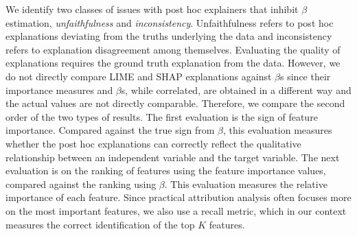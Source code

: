 \documentclass[mnsc,blindrev]{informs3}
\begin{document}
We identify two classes of issues with post hoc explainers that inhibit $\beta$ estimation, \textit{unfaithfulness} and \textit{inconsistency}. Unfaithfulness refers to post hoc explanations deviating from the truths underlying the data and inconsistency refers to explanation disagreement among themselves. Evaluating the quality of explanations requires the ground truth explanation from the data. However, we do not directly compare LIME and SHAP explanations against $\beta$s since their importance measures and $\beta$s, while correlated, are obtained in a different way and the actual values are not directly comparable. Therefore, we compare the second order of the two types of results. The first evaluation is the sign of feature importance. Compared against the true sign from $\beta$, this evaluation measures whether the post hoc explanations can correctly reflect the qualitative relationship between an independent variable and the target variable. The next evaluation is on the ranking of features using the feature importance values, compared against the ranking using $\beta$. This evaluation measures the relative importance of each feature. Since practical attribution analysis often focuses more on the most important features, we also use a recall metric, which in our context measures the correct identification of the top $K$ features. 
\end{document}

